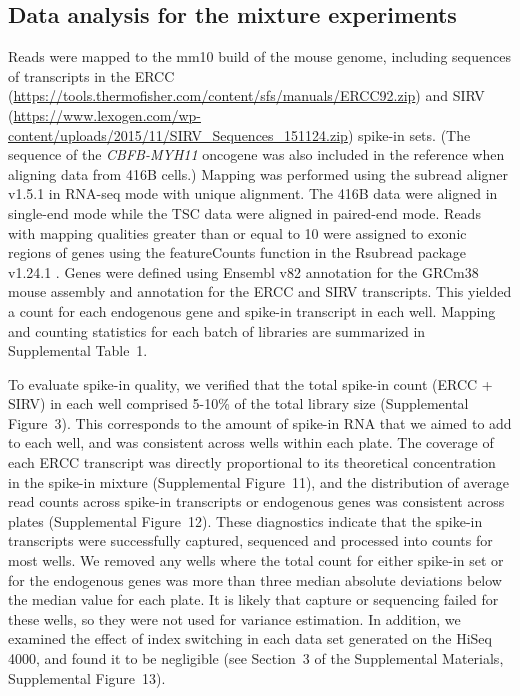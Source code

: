 \documentclass{article}
\newcommand{\suppfigtotals}{3}
\newcommand{\suppfigspikeconc}{11}
\newcommand{\suppfigspikeave}{12}
\newcommand{\suppfigindex}{13}
\newcommand{\suppsecindex}{3}
\newcommand{\supptabstats}{1}
\begin{document}
\subsection*{Data analysis for the mixture experiments}
Reads were mapped to the mm10 build of the mouse genome, including sequences of transcripts in the ERCC (\url{https://tools.thermofisher.com/content/sfs/manuals/ERCC92.zip}) and SIRV (\url{https://www.lexogen.com/wp-content/uploads/2015/11/SIRV_Sequences_151124.zip}) spike-in sets.
(The sequence of the \textit{CBFB-MYH11} oncogene was also included in the reference when aligning data from 416B cells.)
Mapping was performed using the subread aligner v1.5.1 \autocite{liao2013subread} in RNA-seq mode with unique alignment.
The 416B data were aligned in single-end mode while the TSC data were aligned in paired-end mode.
Reads with mapping qualities greater than or equal to 10 were assigned to exonic regions of genes using the featureCounts function in the Rsubread package v1.24.1 \autocite{liao2014featurecounts}.
Genes were defined using Ensembl v82 annotation for the GRCm38 mouse assembly and annotation for the ERCC and SIRV transcripts.
This yielded a count for each endogenous gene and spike-in transcript in each well.
Mapping and counting statistics for each batch of libraries are summarized in Supplemental Table~\supptabstats{}.

To evaluate spike-in quality, we verified that the total spike-in count (ERCC + SIRV) in each well comprised 5-10\% of the total library size (Supplemental Figure~\suppfigtotals{}).
This corresponds to the amount of spike-in RNA that we aimed to add to each well, and was consistent across wells within each plate.
The coverage of each ERCC transcript was directly proportional to its theoretical concentration in the spike-in mixture (Supplemental Figure~\suppfigspikeconc{}),
and the distribution of average read counts across spike-in transcripts or endogenous genes was consistent across plates (Supplemental Figure~\suppfigspikeave{}).
These diagnostics indicate that the spike-in transcripts were successfully captured, sequenced and processed into counts for most wells.
We removed any wells where the total count for either spike-in set or for the endogenous genes was more than three median absolute deviations below the median value for each plate. 
It is likely that capture or sequencing failed for these wells, so they were not used for variance estimation.
In addition, we examined the effect of index switching \autocite{sinha2017index} in each data set generated on the HiSeq 4000, and found it to be negligible (see Section~\suppsecindex{} of the Supplemental Materials, Supplemental Figure~\suppfigindex{}).
\end{document}
